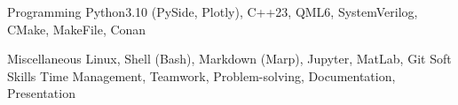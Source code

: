 

\begin{cvskills}

  \cvskill
    {Programming} %
    {Python3.10 (PySide, Plotly), C++23, QML6, SystemVerilog, CMake, MakeFile, Conan} %

  \cvskill
    {Miscellaneous} %
    {Linux, Shell (Bash), Markdown (Marp), Jupyter, MatLab, Git} %
  \cvskill
    {Soft Skills} %
    {Time Management, Teamwork, Problem-solving, Documentation, Presentation} %

\end{cvskills}

